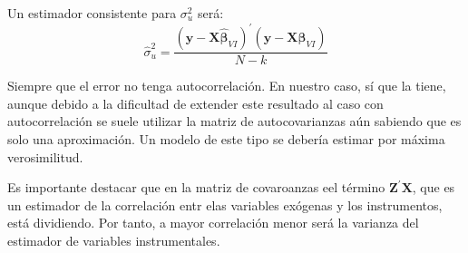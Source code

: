 Un estimador consistente para $\sigma_u^2$ ser\'a:
\[\hat{\sigma}_u^2=\dfrac{\left(\boldsymbol{y}-\boldsymbol{X}\hat{\boldsymbol{\beta}}_{VI}\right)^{\prime}\left(\boldsymbol{y}-\boldsymbol{X}\hat{\boldsymbol{\beta}}_{VI}\right)}{N-k}\]

Siempre que el error no tenga autocorrelaci\'on. En nuestro caso, s\'i que la tiene, aunque debido a la dificultad de extender este resultado al caso con autocorrelaci\'on se suele utilizar la matriz de autocovarianzas a\'un sabiendo que es solo una aproximaci\'on. Un modelo de este tipo se deber\'ia estimar por m\'axima verosimilitud.

Es importante destacar que en la matriz de covaroanzas eel t\'ermino $\boldsymbol{Z}^{\prime}\boldsymbol{X}$, que es un estimador de la correlaci\'on entr elas variables ex\'ogenas y los instrumentos, est\'a dividiendo. Por tanto, a mayor correlaci\'on menor ser\'a la varianza del estimador de variables instrumentales.







